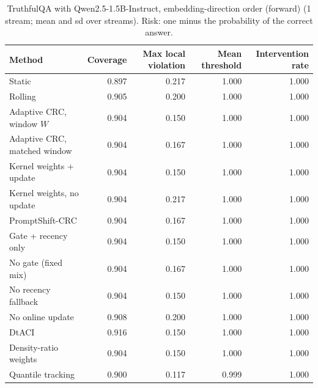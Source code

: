 \begin{table}[H]
\centering
\small
\caption{TruthfulQA with Qwen2.5-1.5B-Instruct, embedding-direction order (forward) (1 stream; mean and sd over streams). Risk: one minus the probability of the correct answer.}
\label{tab:truthfulqa_pc1_forward}
\begin{tabular}{lrrrr}
\toprule
Method & Coverage & Max local violation & Mean threshold & Intervention rate \\
\midrule
Static & 0.897 & 0.217 & 1.000 & 1.000 \\
Rolling & 0.905 & 0.200 & 1.000 & 1.000 \\
Adaptive CRC, window $W$ & 0.904 & 0.150 & 1.000 & 1.000 \\
Adaptive CRC, matched window & 0.904 & 0.167 & 1.000 & 1.000 \\
Kernel weights + update & 0.904 & 0.150 & 1.000 & 1.000 \\
Kernel weights, no update & 0.904 & 0.217 & 1.000 & 1.000 \\
PromptShift-CRC & 0.904 & 0.167 & 1.000 & 1.000 \\
Gate + recency only & 0.904 & 0.150 & 1.000 & 1.000 \\
No gate (fixed mix) & 0.904 & 0.167 & 1.000 & 1.000 \\
No recency fallback & 0.904 & 0.150 & 1.000 & 1.000 \\
No online update & 0.908 & 0.200 & 1.000 & 1.000 \\
DtACI & 0.916 & 0.150 & 1.000 & 1.000 \\
Density-ratio weights & 0.904 & 0.150 & 1.000 & 1.000 \\
Quantile tracking & 0.900 & 0.117 & 0.999 & 1.000 \\
\bottomrule
\end{tabular}
\end{table}

